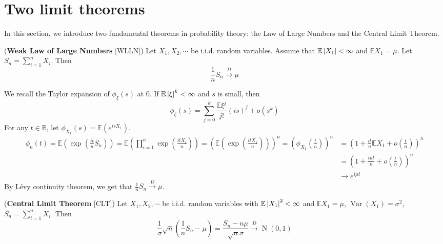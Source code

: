 \documentclass{huhtakm-template-book}
\newcommand{\expect}{\mathbb{E}}
\DeclareMathOperator{\N}{N}
\DeclareMathOperator{\Var}{Var}
\begin{document}
\section{Two limit theorems}
    In this section, we introduce two fundamental theorems in probability theory: the Law of Large Numbers and the Central Limit Theorem.
    \begin{thm}(\textbf{Weak Law of Large Numbers} [WLLN])
        Let $X_{1},X_{2},\cdots$ be i.i.d. random variables. Assume that $\expect\abs{X_{1}}<\infty$ and $\expect X_{1}=\mu$. Let $S_{n}=\sum_{i=1}^{n}X_{i}$. Then
        \begin{equation*}
            \frac{1}{n}S_{n}\xrightarrow{D}\mu
        \end{equation*}
    \end{thm}
    \begin{proofing}
        We recall the Taylor expansion of $\phi_{\xi}(s)$ at $0$. If $\expect\abs{\xi}^{k}<\infty$ and $s$ is small, then
        \begin{equation*}
            \phi_{\zeta}(s)=\sum_{j=0}^{k}\frac{\expect\xi^{j}}{j!}(is)^{j}+o(s^{k})
        \end{equation*}
        For any $t\in\mathbb{R}$, let $\phi_{X_{1}}(s)=\expect(e^{isX_{1}})$.
        \begin{align*}
            \phi_{n}(t)=\expect\left(\exp\left(\frac{it}{n}S_{n}\right)\right)=\expect\left(\prod_{i=1}^{n}\exp\left(\frac{itX_{i}}{n}\right)\right)=\left(\expect\left(\exp\left(\frac{itX_{1}}{n}\right)\right)\right)^{n}=\left(\phi_{X_{1}}\left(\frac{t}{n}\right)\right)^{n}&=\left(1+\frac{it}{n}\expect X_{1}+o\left(\frac{t}{n}\right)\right)^{n}\\
            &=\left(1+\frac{i\mu t}{n}+o\left(\frac{t}{n}\right)\right)^{n}\\
            &\to e^{i\mu t}
        \end{align*}
        By L\'evy continuity theorem, we get that $\frac{1}{n}S_{n}\xrightarrow{D}\mu$.
    \end{proofing}
    \begin{thm}(\textbf{Central Limit Theorem} [CLT])
        Let $X_{1},X_{2},\cdots$ be i.i.d. random variables with $\expect\abs{X_{1}}^{2}<\infty$ and $\expect X_{1}=\mu$, $\Var(X_{1})=\sigma^{2}$, $S_{n}=\sum_{i=1}^{n}X_{i}$. Then
        \begin{equation*}
            \frac{1}{\sigma}\sqrt{n}\left(\frac{1}{n}S_{n}-\mu\right)=\frac{S_{n}-n\mu}{\sqrt{n}\sigma}\xrightarrow{D}\N(0,1)
        \end{equation*}
    \end{thm}
\end{document}
